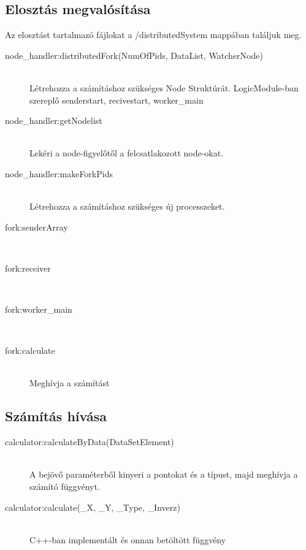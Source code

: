 \subsection{Elosztás megvalósítása}
	Az elosztást tartalmazó fájlokat a /distributedSystem mappában találjuk meg. 
	\begin{description}
		\item[node\_handler:distributedFork(NumOfPids, DataList, WatcherNode)]
		\hfill \\
		Létrehozza a számításhoz szükséges Node Struktúrát.
		LogicModule-ban szereplő senderstart, recivestart, worker\_main 
		\item[node\_handler:getNodelist]
		\hfill \\
		Lekéri a node-figyelőtől a felcsatlakozott node-okat.
		\item[node\_handler:makeForkPids]
		\hfill \\
		Létrehozza a számításhoz szükséges új processzeket.

		\item[fork:senderArray]
		\hfill \\ 

		\item[fork:receiver]
		\hfill \\
		\item[fork:worker\_main]
		\hfill \\
		\item[fork:calculate]
		\hfill \\ Meghívja a számítást
	\end{description}
\subsection{Számítás hívása}
	\begin{description}
	\item[calculator:calculateByData(DataSetElement)]
	\hfill \\ 
	A bejövő paraméterből kinyeri a pontokat és a típust, majd meghívja a számító függvényt.
	\item[calculator:calculate(\_X, \_Y, \_Type, \_Inverz)]
	\hfill \\ C++-ban implementált és onnan betöltött függvény
	\end{description}

